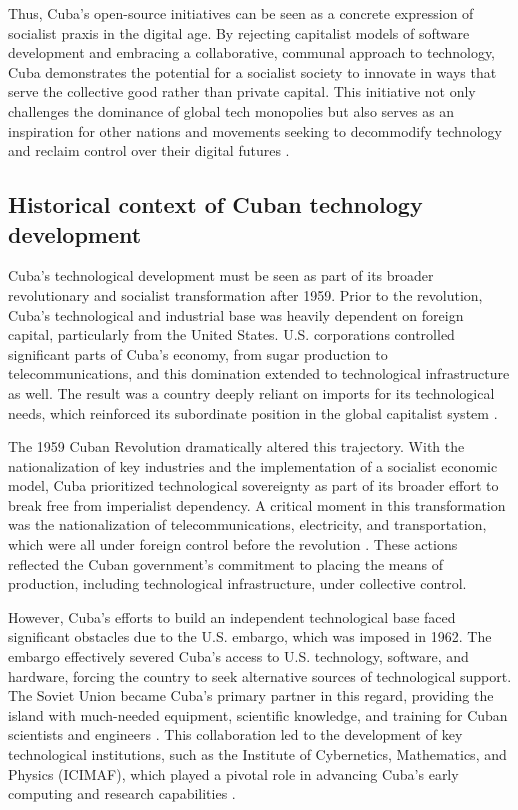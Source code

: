 \begin{refsection}
Thus, Cuba's open-source initiatives can be seen as a concrete expression of socialist praxis in the digital age. By rejecting capitalist models of software development and embracing a collaborative, communal approach to technology, Cuba demonstrates the potential for a socialist society to innovate in ways that serve the collective good rather than private capital. This initiative not only challenges the dominance of global tech monopolies but also serves as an inspiration for other nations and movements seeking to decommodify technology and reclaim control over their digital futures \cite[pp.~90-112]{gunderfrank}.

\subsection{Historical context of Cuban technology development}

Cuba's technological development must be seen as part of its broader revolutionary and socialist transformation after 1959. Prior to the revolution, Cuba's technological and industrial base was heavily dependent on foreign capital, particularly from the United States. U.S. corporations controlled significant parts of Cuba's economy, from sugar production to telecommunications, and this domination extended to technological infrastructure as well. The result was a country deeply reliant on imports for its technological needs, which reinforced its subordinate position in the global capitalist system \cite[pp.~56-78]{perez-stable}.

The 1959 Cuban Revolution dramatically altered this trajectory. With the nationalization of key industries and the implementation of a socialist economic model, Cuba prioritized technological sovereignty as part of its broader effort to break free from imperialist dependency. A critical moment in this transformation was the nationalization of telecommunications, electricity, and transportation, which were all under foreign control before the revolution \cite[pp.~23-45]{prevost}. These actions reflected the Cuban government's commitment to placing the means of production, including technological infrastructure, under collective control.

However, Cuba's efforts to build an independent technological base faced significant obstacles due to the U.S. embargo, which was imposed in 1962. The embargo effectively severed Cuba's access to U.S. technology, software, and hardware, forcing the country to seek alternative sources of technological support. The Soviet Union became Cuba's primary partner in this regard, providing the island with much-needed equipment, scientific knowledge, and training for Cuban scientists and engineers \cite[pp.~212-231]{fagen}. This collaboration led to the development of key technological institutions, such as the Institute of Cybernetics, Mathematics, and Physics (ICIMAF), which played a pivotal role in advancing Cuba’s early computing and research capabilities \cite[pp.~56-87]{perez-stable}.


\end{refsection}
